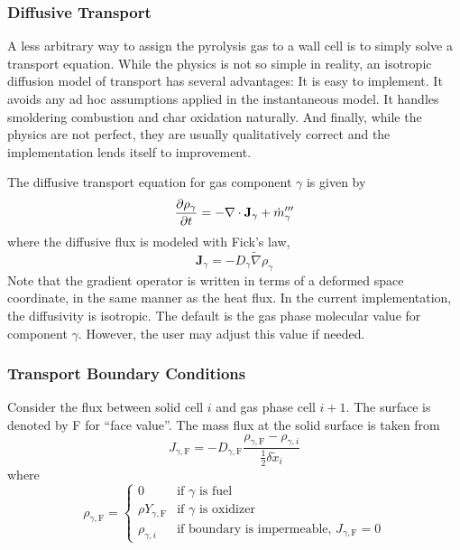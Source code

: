 \subsubsection*{Diffusive Transport}
\label{sec:diffusive_transport}

A less arbitrary way to assign the pyrolysis gas to a wall cell is to simply solve a transport equation.  While the physics is not so simple in reality, an isotropic diffusion model of transport has several advantages:  It is easy to implement.  It avoids any ad hoc assumptions applied in the instantaneous model.  It handles smoldering combustion and char oxidation naturally.  And finally, while the physics are not perfect, they are usually qualitatively correct and the implementation lends itself to improvement.

The diffusive transport equation for gas component $\gamma$ is given by
\begin{equation}
\label{eq:diff}
\frac{\partial \rho_\gamma}{\partial t} = - \nabla\cdot\mathbf{J}_\gamma + \dot{m}_{\gamma}'''
\end{equation}
where the diffusive flux is modeled with Fick's law,
\begin{equation}
\label{eq:fick}
\mathbf{J}_\gamma = - D_{\gamma} \tilde{\nabla} \rho_\gamma
\end{equation}
Note that the gradient operator is written in terms of a deformed space coordinate, in the same manner as the heat flux.  In the current implementation, the diffusivity is isotropic.  The default is the gas phase molecular value for component $\gamma$.  However, the user may adjust this value if needed.

\subsubsection*{Transport Boundary Conditions}
\label{sec:transport_bcs}

Consider the flux between solid cell $i$ and gas phase cell $i+1$.  The surface is denoted by F for ``face value''. The mass flux at the solid surface is taken from
\begin{equation}
\label{eq:massflux_boundary}
J_{\gamma,\mathrm{F}} = - D_{\gamma,\mathrm{F}} \frac{\rho_{\gamma,\mathrm{F}} - \rho_{\gamma,i}}{\frac{1}{2}\delta \tilde{x}_i}
\end{equation}
where
\begin{equation}
\label{eq:rhoF}
\rho_{\gamma,\mathrm{F}} =
\left\{\begin{array}{ll}
0                          & \mbox{if $\gamma$ is fuel} \\
\rho Y_{\gamma,\mathrm{F}} & \mbox{if $\gamma$ is oxidizer} \\
\rho_{\gamma,i}            & \mbox{if boundary is impermeable, $J_{\gamma,\mathrm{F}}=0$}
\end{array}\right.
\end{equation}

